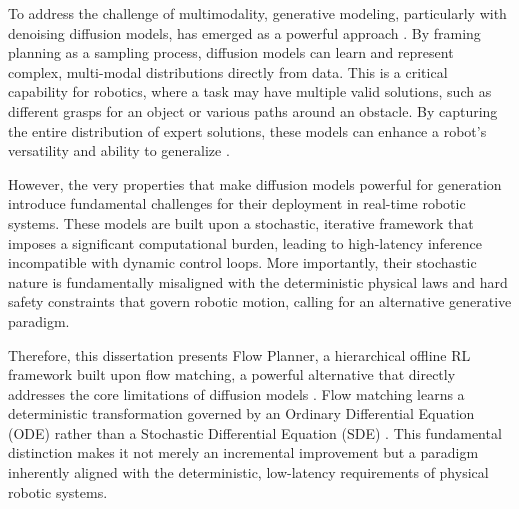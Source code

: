 To address the challenge of multimodality, generative modeling, particularly with denoising diffusion models, has emerged as a powerful approach \cite{hoDenoisingDiffusionProbabilistic2020a}. By framing planning as a sampling process, diffusion models can learn and represent complex, multi-modal distributions directly from data. This is a critical capability for robotics, where a task may have multiple valid solutions, such as different grasps for an object or various paths around an obstacle. By capturing the entire distribution of expert solutions, these models can enhance a robot's versatility and ability to generalize \cite{chiDiffusionPolicyVisuomotor2023, jannerPlanningDiffusionFlexible2022}.

However, the very properties that make diffusion models powerful for generation introduce fundamental challenges for their deployment in real-time robotic systems. These models are built upon a stochastic, iterative framework that imposes a significant computational burden, leading to high-latency inference incompatible with dynamic control loops. More importantly, their stochastic nature is fundamentally misaligned with the deterministic physical laws and hard safety constraints that govern robotic motion, calling for an alternative generative paradigm.

Therefore, this dissertation presents Flow Planner, a hierarchical offline RL framework built upon flow matching, a powerful alternative that directly addresses the core limitations of diffusion models \cite{lipmanFlowMatchingGenerative2023a}. Flow matching learns a deterministic transformation governed by an Ordinary Differential Equation (ODE) rather than a Stochastic Differential Equation (SDE) \cite{holderriethIntroductionFlowMatching2025}. This fundamental distinction makes it not merely an incremental improvement but a paradigm inherently aligned with the deterministic, low-latency requirements of physical robotic systems.


